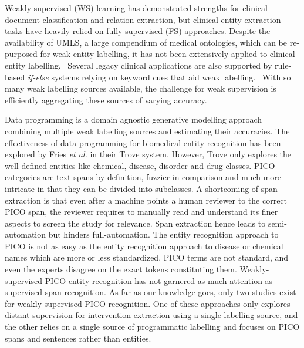 \documentclass[10.7pt,]{article}
\begin{document}
Weakly-supervised (WS) learning has demonstrated strengths for clinical document classification and relation extraction, but clinical entity extraction tasks have heavily relied on fully-supervised (FS) approaches.\cite{meng2018weakly,wang2019clinical,mintz2009distant,elangovan2020assigning,weber2020pedl,mallory2020extracting}
Despite the availability of UMLS, a large compendium of medical ontologies, which can be re-purposed for weak entity labelling, it has not been extensively applied to clinical entity labelling.~\cite{humphreys1998unified}
Several legacy clinical applications are also supported by rule-based \textit{if-else} systems relying on keyword cues that aid weak labelling.~\cite{friedlin2008software,kim2017extracting,yang2015automatic}
With so many weak labelling sources available, the challenge for weak supervision is efficiently aggregating these sources of varying accuracy.


Data programming is a domain agnostic generative modelling approach combining multiple weak labelling sources and estimating their accuracies.
The effectiveness of data programming for biomedical entity recognition has been explored by Fries \textit{et al.} in their Trove system.
However, Trove only explores the well defined entities like chemical, disease, disorder and drug classes.\cite{fries2021ontology}
PICO categories are text spans by definition, fuzzier in comparison and much more intricate in that they can be divided into subclasses.
A shortcoming of span extraction is that even after a machine points a human reviewer to the correct PICO span, the reviewer requires to manually read and understand its finer aspects to screen the study for relevance.
Span extraction hence leads to semi-automation but hinders full-automation.
The entity recognition approach to PICO is not as easy as the entity recognition approach to disease or chemical names which are more or less standardized.
PICO terms are not standard, and even the experts disagree on the exact tokens constituting them.\cite{brockmeier2019improving}
Weakly-supervised PICO entity recognition has not garnered as much attention as supervised span recognition.
As far as our knowledge goes, only two studies exist for weakly-supervised PICO recognition.
One of these approaches only explores distant supervision for intervention extraction using a single labelling source, and the other relies on a single source of programmatic labelling and focuses on PICO spans and sentences rather than entities.\cite{liu2021sent2span,dhrangadhariya2022distant}
\end{document}
